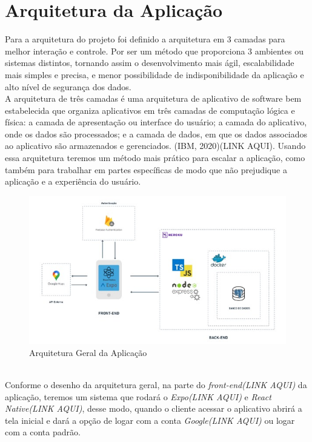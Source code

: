 \section{Arquitetura da Aplicação}
Para a arquitetura do projeto foi definido a arquitetura em 3 camadas para melhor interação e controle. Por ser um método que proporciona 3 ambientes ou sistemas distintos, tornando assim o desenvolvimento mais ágil, escalabilidade mais simples e precisa, e menor possibilidade de indisponibilidade da aplicação e alto nível de segurança dos dados.\\
A arquitetura de três camadas é uma arquitetura de aplicativo de software bem estabelecida que organiza aplicativos em três camadas de computação lógica e física: a camada de apresentação ou interface do usuário; a camada do aplicativo, onde os dados são processados; e a camada de dados, em que os dados associados ao aplicativo são armazenados e gerenciados. (IBM, 2020)(LINK AQUI). Usando essa arquitetura teremos um método mais prático para escalar a aplicação, como também para trabalhar em partes específicas de modo que não prejudique a aplicação e a experiência do usuário.\\
\newpage
\begin{figure}
    \centering
    \includegraphics{exemplos/diagramas/Arquitetura Geral da Aplicação.jpeg}
    \caption{Arquitetura Geral da Aplicação}
    \label{fig:Arquitetura Geral da Aplicação}
\end{figure}\\
Conforme o desenho da arquitetura geral, na parte do \textit{front-end(LINK AQUI)} da aplicação, teremos um sistema que rodará o \textit{Expo(LINK AQUI)} e \textit{React Native(LINK AQUI)}, desse modo, quando o cliente acessar o aplicativo abrirá a tela inicial e dará a opção de logar com a conta \textit{Google(LINK AQUI)} ou logar com a conta padrão. \\
